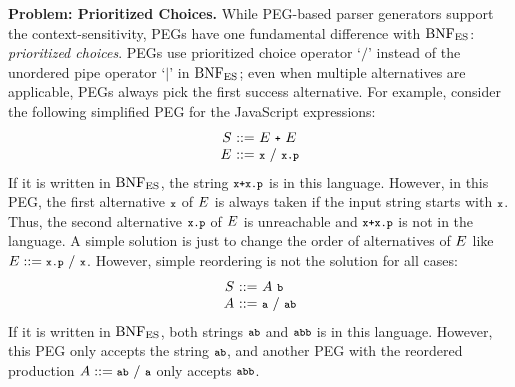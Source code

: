 \smallskip

\textbf{Problem: Prioritized Choices.}
While PEG-based parser generators support the context-sensitivity,
PEGs have one fundamental difference with \( \text{BNF}_{\text{ES}} \): \textit{prioritized
choices}.  PEGs use prioritized choice operator `\( / \)' instead of the unordered
pipe operator `\( \mid \)' in \( \text{BNF}_{\text{ES}} \); even when multiple alternatives are
applicable, PEGs always pick the first success alternative.  For example,
consider the following simplified PEG for the JavaScript expressions:
\begin{equation}
  \begin{array}{r@{~}c@{~}l}
    \NT{S} &::=& \NT{E} ~ \T{+} ~ \NT{E}\\
    \NT{E} &::=& \T{x} ~/~ \T{x} \T{.} \T{p}\\
  \end{array}
  \label{eq:simple-js}
\end{equation}
If it is written in \( \text{BNF}_{\text{ES}} \), the string \( \texttt{\footnotesize x+x.p} \) is in this
language. However, in this PEG, the first alternative \( \texttt{\footnotesize x} \) of \( E
\) is always taken if the input string starts with \( \texttt{\footnotesize x} \). Thus, the
second alternative \( \texttt{\footnotesize x}\texttt{\footnotesize.}\texttt{\footnotesize p} \) of \( E \) is unreachable and \(
\texttt{\footnotesize x+x.p} \) is not in the language.  A simple solution is just to change the
order of alternatives of \( E \) like \( E ::= \texttt{\footnotesize x} \texttt{\footnotesize.} \texttt{\footnotesize p} ~/~
\texttt{\footnotesize x} \).  However, simple reordering is not the solution for all cases:
\begin{equation}
  \begin{array}{r@{~}c@{~}l}
    \NT{S} &::=& \NT{A} ~ \T{b}\\
    \NT{A} &::=& \T{a} ~/~ \T{a} \T{b}\\
  \end{array}
\end{equation}
If it is written in \( \text{BNF}_{\text{ES}} \), both strings \( \texttt{\footnotesize ab} \) and \( \texttt{\footnotesize abb}
\) is in this language. However, this PEG only accepts the string \( \texttt{\footnotesize ab}
\), and another PEG with the reordered production \( A ::= \texttt{\footnotesize a} \texttt{\footnotesize b}
~/~ \texttt{\footnotesize a} \) only accepts \( \texttt{\footnotesize abb} \).

